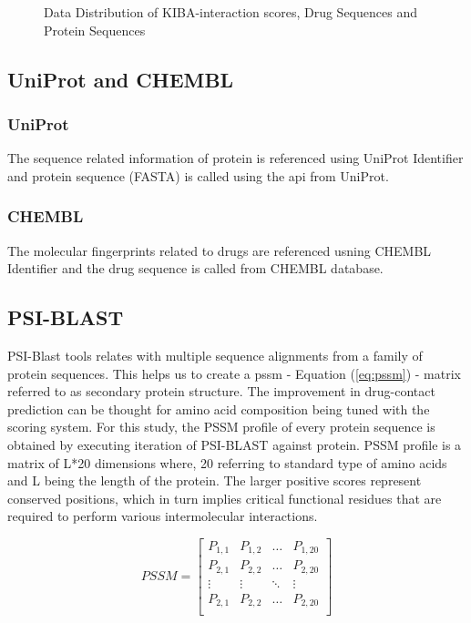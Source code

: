\begin{figure}
         \caption{Data Distribution of KIBA-interaction scores, Drug Sequences and Protein Sequences}
         \label{fig:kiba_drug_protein}
\end{figure}

\subsection{UniProt and CHEMBL }

\subsubsection{UniProt} 
The sequence related information of protein is referenced using UniProt Identifier and protein sequence (FASTA) is called using the api from UniProt. \cite{UniProtConsortium2018}


\subsubsection{CHEMBL}
The molecular fingerprints related to drugs are referenced usning CHEMBL Identifier and the drug sequence is called from CHEMBL database. \cite{Gaulton2017}

\subsection{PSI-BLAST}
PSI-Blast tools relates with multiple sequence alignments from a family of protein sequences\cite{Schaffer2001}. This helps us to create a \acrshort{pssm} - Equation (\ref{eq:pssm}) - matrix referred to as secondary protein structure. The improvement in drug-contact prediction can be thought for amino acid composition being tuned with the scoring system. For this study, the PSSM profile of every protein sequence is obtained by executing iteration of PSI-BLAST against \cite[KEGG]{Schaffer2001} protein. PSSM profile is a matrix of L*20 dimensions where, 20 referring to standard type of amino acids and L being the length of the protein. The larger positive scores represent conserved positions, which in turn implies critical functional residues that are required to perform various intermolecular interactions.\cite[PSSM]{Schaffer2001}

\begin{equation}
  PSSM = \begin{bmatrix}
    P_{1,1} & P_{1,2} & \dots & P_{1,20} \\
    P_{2,1} & P_{2,2} & \dots & P_{2,20} \\
    \vdots  & \vdots  & \ddots & \vdots \\
    P_{2,1} & P_{2,2} & \dots & P_{2,20} \\
  \end{bmatrix}
  \label{eq:pssm}
\end{equation}

